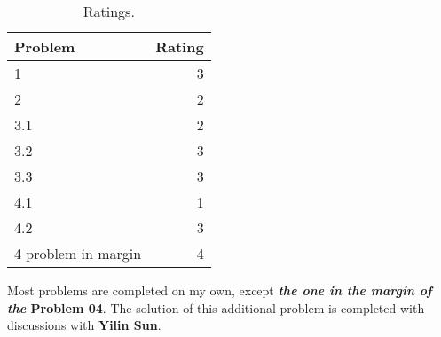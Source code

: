 \documentclass{article}
\begin{document}
\begin{table}[htbp]
    \centering
    \begin{tabular}{lr}
        \hline
        Problem & Rating \\
        \hline 
        1 & 3 \\
        2 & 2 \\
        3.1 & 2 \\
        3.2 & 3 \\
        3.3 & 3 \\
        4.1 & 1 \\
        4.2 & 3 \\
        4 problem in margin & 4 \\
        \hline
\end{tabular}
\caption{Ratings.}
\end{table}

Most problems are completed on my own, except \textbf{\textit{the one in the margin of the} Problem 04}. The solution of this additional problem is completed with discussions with \textbf{Yilin Sun}.
\end{document}

